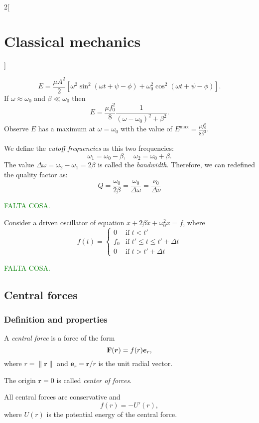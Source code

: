 \documentclass[../../../main.tex]{subfiles}
\begin{document}
\begin{multicols}{2}[\section{Classical mechanics}]
\begin{prop}
    \end{prop}
    \begin{prop}
        $$E=\frac{\mu A^2}{2}\left[\omega^2\sin^2(\omega t+\psi-\phi)+\omega_0^2\cos^2(\omega t+\psi-\phi)\right].$$ If $\omega\approx\omega_0$ and $\beta\ll\omega_0$ then $$E=\frac{\mu f_0^2}{8}\frac{1}{(\omega-\omega_0)^2+\beta^2}.$$ Observe $E$ has a maximum at $\omega=\omega_0$ with the value of $E^\text{max}=\frac{\mu f_0^2}{8\beta^2}$.
    \end{prop}
    \begin{definition}
        We define the \textit{cutoff frequencies} as this two frequencies: $$\omega_1=\omega_0-\beta,\quad\omega_2=\omega_0+\beta.$$ The value  $\Delta\omega=\omega_2-\omega_1=2\beta$ is called the \textit{bandwidth}. Therefore, we can redefined the quality factor as: $$Q=\frac{\omega_0}{2\beta}=\frac{\omega_0}{\Delta\omega}=\frac{\nu_0}{\Delta\nu}$$
    \end{definition}
    \textcolor{green}{FALTA COSA.}
    \begin{prop}
        Consider a driven oscillator of equation $\ddot{x}+2\beta\dot{x}+\omega_0^2x=f$, where $$f(t)=\left\{
            \begin{array}{cc}
                0   & \text{if } t<t'                    \\
                f_0 & \text{if }t'\leq t\leq t'+\Delta t \\
                0   & \text{if } t>t'+\Delta t
            \end{array}\right.$$
    \end{prop}
    \textcolor{green}{FALTA COSA.}
    \subsection{Central forces}
    \subsubsection{Definition and properties}
    \begin{definition}
        A \textit{central force} is a force of the form $$\boldsymbol{\mathrm{F}}(\boldsymbol{r})=f(r)\boldsymbol{e}_r,$$ where $r=\|\boldsymbol{r}\|$ and $\boldsymbol{e}_r=\boldsymbol{r}/r$ is the unit radial vector.
    \end{definition}
    \begin{definition}
        The origin $\boldsymbol{r}=0$ is called \textit{center of forces}.
    \end{definition}
    \begin{prop}
        All central forces are conservative and $$f(r)=-U'(r),$$ where $U(r)$ is the potential energy of the central force.
    \end{prop}

\end{multicols}
\end{document}
